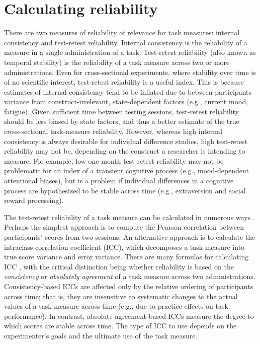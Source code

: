 \documentclass[a4paper,12pt]{article}
\begin{document}
\section{Calculating reliability}

There are two measures of reliability of relevance for task measures: internal consistency and test-retest reliability. Internal consistency is the reliability of a measure in a single administration of a task. Test-retest reliability (also known as temporal stability) is the reliability of a task measure across two or more administrations. Even for cross-sectional experiments, where stability over time is of no scientific interest, test-retest reliability is a useful index. This is because estimates of internal consistency tend to be inflated due to between-participants variance from construct-irrelevant, state-dependent factors (e.g., current mood, fatigue). Given sufficient time between testing sessions, test-retest reliability should be less biased by state factors, and thus a better estimate of the true cross-sectional task-measure reliability. However, whereas high internal consistency is always desirable for individual difference studies, high test-retest reliability may not be, depending on the construct a researcher is intending to measure. For example, low one-month test-retest reliability may not be problematic for an index of a transient cognitive process (e.g., mood-dependent attentional biases), but is a problem if individual differences in a cognitive process are hypothesized to be stable across time (e.g., extraversion and social reward processing).

The test-retest reliability of a task measure can be calculated in numerous ways \cite{Parsons2019-jw}. Perhaps the simplest approach is to compute the Pearson correlation between participants' scores from two sessions. An alternative approach is to calculate the intraclass correlation coefficient (ICC), which decomposes a task measure into true score variance and error variance. There are many formulas for calculating ICC \cite{Koo2016-fz}, with the critical distinction being whether reliability is based on the \textit{consistency} or \textit{absolutely agreement} of a task measure across two administrations. Consistency-based ICCs are affected only by the relative ordering of participants across time; that is, they are insensitive to systematic changes to the actual values of a task measure across time (e.g., due to practice effects on task performance). In contrast, absolute-agreement-based ICCs measure the degree to which scores are stable across time. The type of ICC to use depends on the experimenter's goals and the ultimate use of the task measure.
\end{document}
